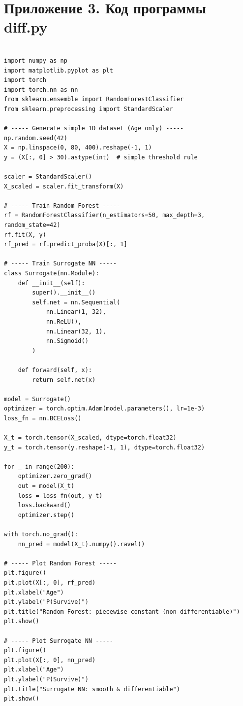 \documentclass[14pt,a4paper]{extarticle}
\begin{document}
\section*{Приложение 3. Код программы diff.py}

\begin{verbatim}

import numpy as np
import matplotlib.pyplot as plt
import torch
import torch.nn as nn
from sklearn.ensemble import RandomForestClassifier
from sklearn.preprocessing import StandardScaler

# ----- Generate simple 1D dataset (Age only) -----
np.random.seed(42)
X = np.linspace(0, 80, 400).reshape(-1, 1)
y = (X[:, 0] > 30).astype(int)  # simple threshold rule

scaler = StandardScaler()
X_scaled = scaler.fit_transform(X)

# ----- Train Random Forest -----
rf = RandomForestClassifier(n_estimators=50, max_depth=3, random_state=42)
rf.fit(X, y)
rf_pred = rf.predict_proba(X)[:, 1]

# ----- Train Surrogate NN -----
class Surrogate(nn.Module):
    def __init__(self):
        super().__init__()
        self.net = nn.Sequential(
            nn.Linear(1, 32),
            nn.ReLU(),
            nn.Linear(32, 1),
            nn.Sigmoid()
        )

    def forward(self, x):
        return self.net(x)

model = Surrogate()
optimizer = torch.optim.Adam(model.parameters(), lr=1e-3)
loss_fn = nn.BCELoss()

X_t = torch.tensor(X_scaled, dtype=torch.float32)
y_t = torch.tensor(y.reshape(-1, 1), dtype=torch.float32)

for _ in range(200):
    optimizer.zero_grad()
    out = model(X_t)
    loss = loss_fn(out, y_t)
    loss.backward()
    optimizer.step()

with torch.no_grad():
    nn_pred = model(X_t).numpy().ravel()

# ----- Plot Random Forest -----
plt.figure()
plt.plot(X[:, 0], rf_pred)
plt.xlabel("Age")
plt.ylabel("P(Survive)")
plt.title("Random Forest: piecewise-constant (non-differentiable)")
plt.show()

# ----- Plot Surrogate NN -----
plt.figure()
plt.plot(X[:, 0], nn_pred)
plt.xlabel("Age")
plt.ylabel("P(Survive)")
plt.title("Surrogate NN: smooth & differentiable")
plt.show()

\end{verbatim}
\end{document}
